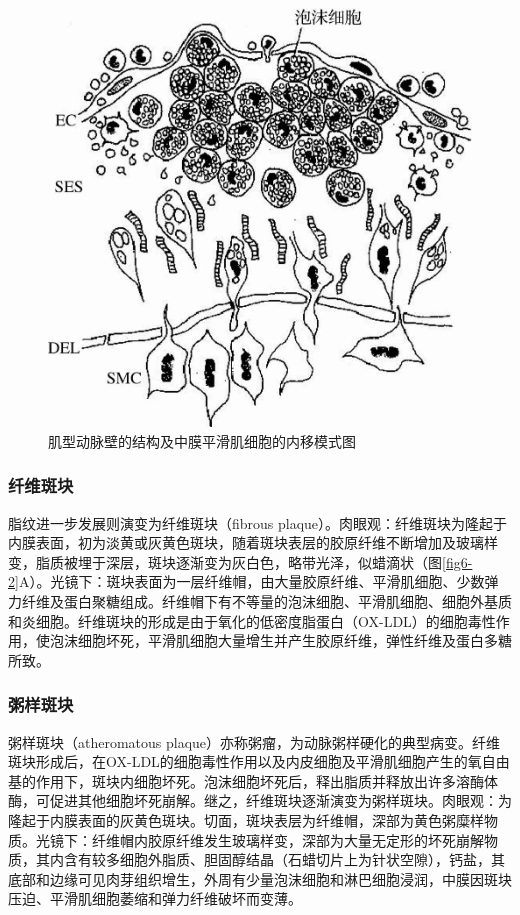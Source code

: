 \begin{figure}[!htbp]
    \centering
    \includegraphics{./images/Image00093.jpg}
    \captionsetup{justification=centering}
    \caption{肌型动脉壁的结构及中膜平滑肌细胞的内移模式图}
    \label{fig6-1}
\end{figure}

\subsubsection{纤维斑块}

脂纹进一步发展则演变为纤维斑块（fibrous
plaque）。肉眼观：纤维斑块为隆起于内膜表面，初为淡黄或灰黄色斑块，随着斑块表层的胶原纤维不断增加及玻璃样变，脂质被埋于深层，斑块逐渐变为灰白色，略带光泽，似蜡滴状（图\ref{fig6-2}A）。光镜下：斑块表面为一层纤维帽，由大量胶原纤维、平滑肌细胞、少数弹力纤维及蛋白聚糖组成。纤维帽下有不等量的泡沫细胞、平滑肌细胞、细胞外基质和炎细胞。纤维斑块的形成是由于氧化的低密度脂蛋白（OX-LDL）的细胞毒性作用，使泡沫细胞坏死，平滑肌细胞大量增生并产生胶原纤维，弹性纤维及蛋白多糖所致。

\subsubsection{粥样斑块}

粥样斑块（atheromatous
plaque）亦称粥瘤，为动脉粥样硬化的典型病变。纤维斑块形成后，在OX-LDL的细胞毒性作用以及内皮细胞及平滑肌细胞产生的氧自由基的作用下，斑块内细胞坏死。泡沫细胞坏死后，释出脂质并释放出许多溶酶体酶，可促进其他细胞坏死崩解。继之，纤维斑块逐渐演变为粥样斑块。肉眼观：为隆起于内膜表面的灰黄色斑块。切面，斑块表层为纤维帽，深部为黄色粥糜样物质。光镜下：纤维帽内胶原纤维发生玻璃样变，深部为大量无定形的坏死崩解物质，其内含有较多细胞外脂质、胆固醇结晶（石蜡切片上为针状空隙），钙盐，其底部和边缘可见肉芽组织增生，外周有少量泡沫细胞和淋巴细胞浸润，中膜因斑块压迫、平滑肌细胞萎缩和弹力纤维破坏而变薄。

